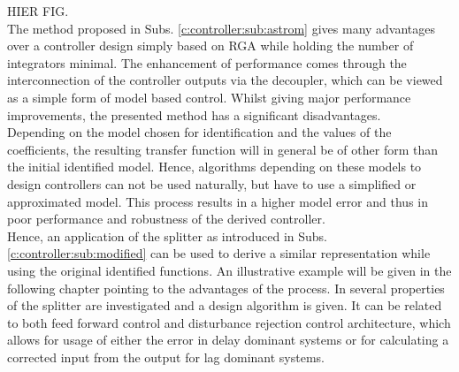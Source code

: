 HIER FIG.\\

The method proposed in Subs. \ref{c:controller:sub:astrom} gives many advantages over a controller design simply based on RGA while holding the number of integrators minimal. The enhancement of performance comes through the interconnection of the controller outputs via the decoupler, which can be viewed as a simple form of model based control. Whilst giving major performance improvements, the presented method has a significant disadvantages.\\

Depending on the model chosen for identification and the values of the coefficients, the resulting transfer function will in general be of other form than the initial identified model. Hence, algorithms depending on these models to design controllers can not be used naturally, but have to use a simplified or approximated model. This process results in a higher model error and thus in poor performance and robustness of the derived controller.\\

Hence, an application of the splitter as introduced in Subs.\ref{c:controller:sub:modified} can be used to derive a similar representation while using the original identified functions. An illustrative example will be given in the following chapter pointing to the advantages of the process. In \cite{Wang2006} several properties of the splitter are investigated and a design algorithm is given. It can be related to both feed forward control and disturbance rejection control architecture, which allows for usage of either the error in delay dominant systems or for calculating a corrected input from the output for lag dominant systems.

